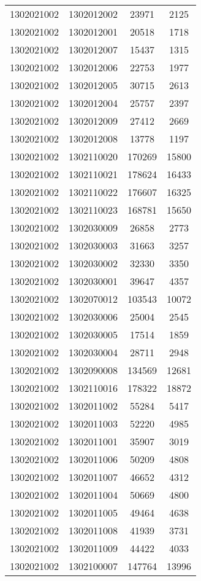 \begin{longtable}{llcc}
1302021002 & 1302012002 & 23971 & 2125\\
1302021002 & 1302012001 & 20518 & 1718\\
1302021002 & 1302012007 & 15437 & 1315\\
1302021002 & 1302012006 & 22753 & 1977\\
1302021002 & 1302012005 & 30715 & 2613\\
1302021002 & 1302012004 & 25757 & 2397\\
1302021002 & 1302012009 & 27412 & 2669\\
1302021002 & 1302012008 & 13778 & 1197\\
1302021002 & 1302110020 & 170269 & 15800\\
1302021002 & 1302110021 & 178624 & 16433\\
1302021002 & 1302110022 & 176607 & 16325\\
1302021002 & 1302110023 & 168781 & 15650\\
1302021002 & 1302030009 & 26858 & 2773\\
1302021002 & 1302030003 & 31663 & 3257\\
1302021002 & 1302030002 & 32330 & 3350\\
1302021002 & 1302030001 & 39647 & 4357\\
1302021002 & 1302070012 & 103543 & 10072\\
1302021002 & 1302030006 & 25004 & 2545\\
1302021002 & 1302030005 & 17514 & 1859\\
1302021002 & 1302030004 & 28711 & 2948\\
1302021002 & 1302090008 & 134569 & 12681\\
1302021002 & 1302110016 & 178322 & 18872\\
1302021002 & 1302011002 & 55284 & 5417\\
1302021002 & 1302011003 & 52220 & 4985\\
1302021002 & 1302011001 & 35907 & 3019\\
1302021002 & 1302011006 & 50209 & 4808\\
1302021002 & 1302011007 & 46652 & 4312\\
1302021002 & 1302011004 & 50669 & 4800\\
1302021002 & 1302011005 & 49464 & 4638\\
1302021002 & 1302011008 & 41939 & 3731\\
1302021002 & 1302011009 & 44422 & 4033\\
1302021002 & 1302100007 & 147764 & 13996\\

\end{longtable}
